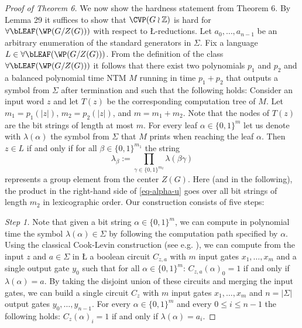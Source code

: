 \begin{proof}[Proof of Theorem 6]
We now show the hardness statement from Theorem 6.
By Lemma 29 it suffices to show that $\CVP(G \wr \mathbb{Z})$ 
is hard for $\forall\bLEAF(\WP(G/Z(G)))$ with respect to \L-reductions. Let $a_0, \ldots, a_{n-1}$ be an arbitrary enumeration of the standard generators in $\Sigma$.
Fix a language $L \in \forall\bLEAF(\WP(G/Z(G)))$. From the definition of the class $\forall\bLEAF(\WP(G/Z(G)))$ it follows that
there exist two polynomials $p_1$ and $p_2$ and a balanced polynomial time NTM $M$ running in time $p_1+p_2$
that outputs a symbol from $\Sigma$ after termination and such that the following holds: Consider an input word
$z$ and let $T(z)$ be the corresponding computation tree of $M$. 
Let $m_1 = p_1(|z|)$, $m_2 = p_2(|z|)$, and $m = m_1+m_2$. Note that the nodes of $T(z)$ are the bit strings of length at most $m$.
For every leaf $\alpha \in \{0,1\}^m$ let us denote with $\lambda(\alpha)$ the symbol from $\Sigma$ that $M$ prints 
when reaching the leaf $\alpha$. Then $z \in L$ if and only if for all
$\beta \in \{0,1\}^{m_1}$ the string 
\begin{equation} \label{eq-alpha-u}
\lambda_\beta := \prod_{\gamma \in \{0,1\}^{m_2}}\lambda(\beta\gamma)
\end{equation}
represents a group element from the center $Z(G)$. Here (and in the following), the product in the right-hand side of  \eqref{eq-alpha-u} goes over all bit strings of length $m_2$
in lexicographic order.
Our construction consists of five steps:

\medskip
\noindent
{\em Step 1.}
Note that given a bit string $\alpha \in \{0,1\}^m$, we can 
compute in polynomial time the symbol $\lambda(\alpha) \in \Sigma$ by following the computation path specified by $\alpha$. 
Using the classical Cook-Levin construction 
(see e.g. \cite{ref2}), we can compute from the input $z$ and $a \in \Sigma$  in \L
a boolean circuit $C_{z,a}$ with $m$ input gates $x_1, \ldots, x_m$ and a single output gate $y_0$
such that for all $\alpha \in \{0,1\}^m$:
$C_{z,a}(\alpha)_0 = 1$ if and only if $\lambda(\alpha) = a$. 
By taking the disjoint union of these circuits and merging the input gates,
we can build a single circuit $C_z$ with $m$ input gates $x_1, \ldots, x_m$
and $n = |\Sigma|$ output gates $y_0, \ldots, y_{n-1}$. For every $\alpha \in \{0,1\}^m$ and every
$0 \leq i \leq n-1$ the following holds: $C_z(\alpha)_i = 1$ if and only if $\lambda(\alpha) = a_i$.


\end{proof}
